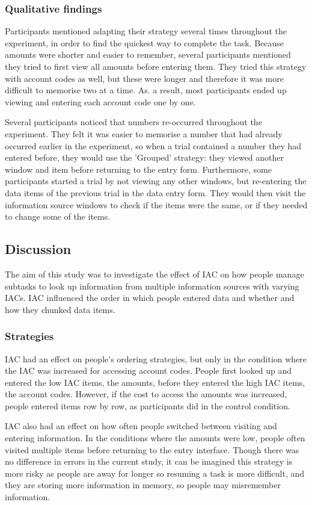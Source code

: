 \begin{table}
\begin{itemize}
\subsubsection{Qualitative findings}
Participants mentioned adapting their strategy several times throughout the experiment, in order to find the quickest way to complete the task. Because amounts were shorter and easier to remember, several participants mentioned they tried to first view all amounts before entering them. They tried this strategy with account codes as well, but these were longer and therefore it was more difficult to memorise two at a time. As. a result, most participants ended up viewing and entering each account code one by one.

Several participants noticed that numbers re-occurred throughout the experiment. They felt it was easier to memorise a number that had already occurred earlier in the experiment, so when a trial contained a number they had entered before, they would use the 'Grouped' strategy: they viewed another window and item before returning to the entry form. Furthermore, some participants started a trial by not viewing any other windows, but re-entering the data items of the previous trial in the data entry form. They would then visit the information source windows to check if the items were the same, or if they needed to change some of the items.

\subsection{Discussion}
The aim of this study was to investigate the effect of IAC on how people manage subtasks to look up information from multiple information sources with varying IACs. IAC influenced the order in which people entered data and whether and how they chunked data items.

\subsubsection{Strategies}
IAC had an effect on people's ordering strategies, but only in the condition where the IAC was increased for accessing account codes. People first looked up and entered the low IAC items, the amounts, before they entered the high IAC items, the account codes. However, if the cost to access the amounts was increased, people entered items row by row, as participants did in the control condition.

IAC also had an effect on how often people switched between visiting and entering information. In the conditions where the amounts were low, people often visited multiple items before returning to the entry interface. Though there was no difference in errors in the current study, it can be imagined this strategy is more risky as people are away for longer so resuming a task is more difficult, and they are storing more information in memory, so people may misremember information.


\end{itemize}
\end{table}
